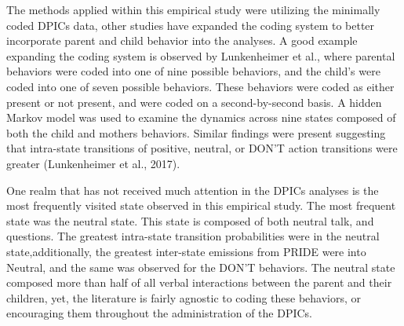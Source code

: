 \documentclass[12pt]{./styles/outhesis}
\begin{document}
The methods applied within this empirical study were utilizing the
minimally coded DPICs data, other studies have expanded the coding
system to better incorporate parent and child behavior into the
analyses. A good example expanding the coding system is observed by
Lunkenheimer et al., where parental behaviors were coded into one of
nine possible behaviors, and the child's were coded into one of seven
possible behaviors. These behaviors were coded as either present or not
present, and were coded on a second-by-second basis. A hidden Markov
model was used to examine the dynamics across nine states composed of
both the child and mothers behaviors. Similar findings were present
suggesting that intra-state transitions of positive, neutral, or DON'T
action transitions were greater (Lunkenheimer et al., 2017).

One realm that has not received much attention in the DPICs analyses is
the most frequently visited state observed in this empirical study. The
most frequent state was the neutral state. This state is composed of
both neutral talk, and questions. The greatest intra-state transition probabilities were in the
neutral state,additionally, the greatest inter-state emissions from PRIDE were into
Neutral, and the same was observed for the DON'T behaviors. The neutral
state composed more than half of all verbal interactions between the
parent and their children, yet, the literature is fairly agnostic to
coding these behaviors, or encouraging them throughout the
administration of the DPICs.
\end{document}
